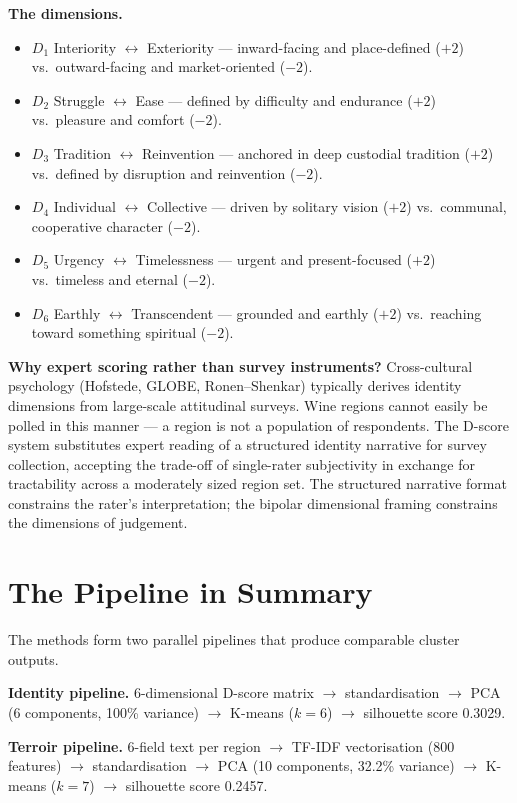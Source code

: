 \documentclass[11pt]{article}
\begin{document}
\textbf{The dimensions.}
\begin{itemize}[leftmargin=2em,itemsep=0.1em,topsep=0.1em]
\item $D_1$ Interiority $\leftrightarrow$ Exteriority --- inward-facing and place-defined ($+2$) vs.\ outward-facing and market-oriented ($-2$).
\item $D_2$ Struggle $\leftrightarrow$ Ease --- defined by difficulty and endurance ($+2$) vs.\ pleasure and comfort ($-2$).
\item $D_3$ Tradition $\leftrightarrow$ Reinvention --- anchored in deep custodial tradition ($+2$) vs.\ defined by disruption and reinvention ($-2$).
\item $D_4$ Individual $\leftrightarrow$ Collective --- driven by solitary vision ($+2$) vs.\ communal, cooperative character ($-2$).
\item $D_5$ Urgency $\leftrightarrow$ Timelessness --- urgent and present-focused ($+2$) vs.\ timeless and eternal ($-2$).
\item $D_6$ Earthly $\leftrightarrow$ Transcendent --- grounded and earthly ($+2$) vs.\ reaching toward something spiritual ($-2$).
\end{itemize}

\textbf{Why expert scoring rather than survey instruments?} Cross-cultural psychology (Hofstede, GLOBE, Ronen--Shenkar) typically derives identity dimensions from large-scale attitudinal surveys. Wine regions cannot easily be polled in this manner --- a region is not a population of respondents. The D-score system substitutes expert reading of a structured identity narrative for survey collection, accepting the trade-off of single-rater subjectivity in exchange for tractability across a moderately sized region set. The structured narrative format constrains the rater's interpretation; the bipolar dimensional framing constrains the dimensions of judgement.

\section{The Pipeline in Summary}

The methods form two parallel pipelines that produce comparable cluster outputs.

\textbf{Identity pipeline.} 6-dimensional D-score matrix $\to$ standardisation $\to$ PCA (6 components, 100\% variance) $\to$ K-means ($k = 6$) $\to$ silhouette score 0.3029.

\textbf{Terroir pipeline.} 6-field text per region $\to$ TF-IDF vectorisation (800 features) $\to$ standardisation $\to$ PCA (10 components, 32.2\% variance) $\to$ K-means ($k = 7$) $\to$ silhouette score 0.2457.
\end{document}
